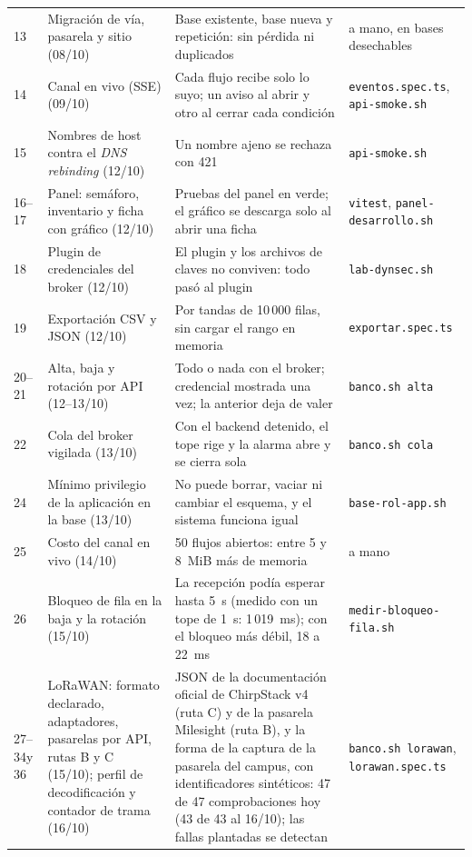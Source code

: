 \begin{longtable}{@{}L{0.8cm}L{3.2cm}L{4.2cm}L{3.8cm}@{}}
13 & Migración de vía, pasarela y sitio (08/10) & Base existente, base nueva y repetición: sin pérdida ni duplicados & a mano, en bases desechables \\
14 & Canal en vivo (SSE) (09/10) & Cada flujo recibe solo lo suyo; un aviso al abrir y otro al cerrar cada condición & {\footnotesize \texttt{eventos.spec.ts}, \texttt{api-smoke.sh}} \\
15 & Nombres de host contra el \emph{DNS rebinding} (12/10) & Un nombre ajeno se rechaza con 421 & {\footnotesize \texttt{api-smoke.sh}} \\
16--17 & Panel: semáforo, inventario y ficha con gráfico (12/10) & Pruebas del panel en verde; el gráfico se descarga solo al abrir una ficha & {\footnotesize \texttt{vitest}, \texttt{panel-desarrollo.sh}} \\
18 & Plugin de credenciales del broker (12/10) & El plugin y los archivos de claves no conviven: todo pasó al plugin & {\footnotesize \texttt{lab-dynsec.sh}} \\
19 & Exportación CSV y JSON (12/10) & Por tandas de 10\,000 filas, sin cargar el rango en memoria & {\footnotesize \texttt{exportar.spec.ts}} \\
20--21 & Alta, baja y rotación por API (12--13/10) & Todo o nada con el broker; credencial mostrada una vez; la anterior deja de valer & {\footnotesize \texttt{banco.sh alta}} \\
22 & Cola del broker vigilada (13/10) & Con el backend detenido, el tope rige y la alarma abre y se cierra sola & {\footnotesize \texttt{banco.sh cola}} \\
24 & Mínimo privilegio de la aplicación en la base (13/10) & No puede borrar, vaciar ni cambiar el esquema, y el sistema funciona igual & {\footnotesize \texttt{base-rol-app.sh}} \\
25 & Costo del canal en vivo (14/10) & 50 flujos abiertos: entre 5 y 8~MiB más de memoria & a mano \\
26 & Bloqueo de fila en la baja y la rotación (15/10) & La recepción podía esperar hasta 5~s (medido con un tope de 1~s: 1\,019~ms); con el bloqueo más débil, 18 a 22~ms & {\footnotesize \texttt{medir-bloqueo-fila.sh}} \\
27--34\newline y 36 & LoRaWAN: formato declarado, adaptadores, pasarelas por API, rutas B y C (15/10); perfil de decodificación y contador de trama (16/10) & JSON de la documentación oficial de ChirpStack v4 (ruta C) y de la pasarela Milesight (ruta B), y la forma de la captura de la pasarela del campus, con identificadores sintéticos: 47 de 47 comprobaciones hoy (43 de 43 al 16/10); las fallas plantadas se detectan & {\footnotesize \texttt{banco.sh lorawan}, \texttt{lorawan.spec.ts}} \\

\end{longtable}
